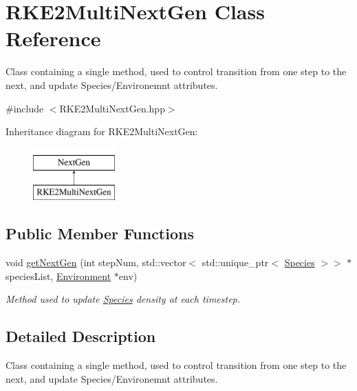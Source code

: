 \hypertarget{classRKE2MultiNextGen}{}\section{R\+K\+E2\+Multi\+Next\+Gen Class Reference}
\label{classRKE2MultiNextGen}


Class containing a single method, used to control transition from one step to the next, and update Species/\+Environemnt attributes.  




{\ttfamily \#include $<$R\+K\+E2\+Multi\+Next\+Gen.\+hpp$>$}

Inheritance diagram for R\+K\+E2\+Multi\+Next\+Gen\+:\begin{figure}[H]
\begin{center}
\leavevmode
\includegraphics[height=2.000000cm]{classRKE2MultiNextGen}
\end{center}
\end{figure}
\subsection*{Public Member Functions}
\begin{DoxyCompactItemize}
\item 
void \hyperlink{classRKE2MultiNextGen_aec093356f0dd470a1ff985d2ff12c3ff}{get\+Next\+Gen} (int step\+Num, std\+::vector$<$ std\+::unique\+\_\+ptr$<$ \hyperlink{classSpecies}{Species} $>$$>$ $\ast$species\+List, \hyperlink{classEnvironment}{Environment} $\ast$env)
\begin{DoxyCompactList}\small\item\em Method used to update \hyperlink{classSpecies}{Species} density at each timestep. \end{DoxyCompactList}\end{DoxyCompactItemize}


\subsection{Detailed Description}
Class containing a single method, used to control transition from one step to the next, and update Species/\+Environemnt attributes. 

